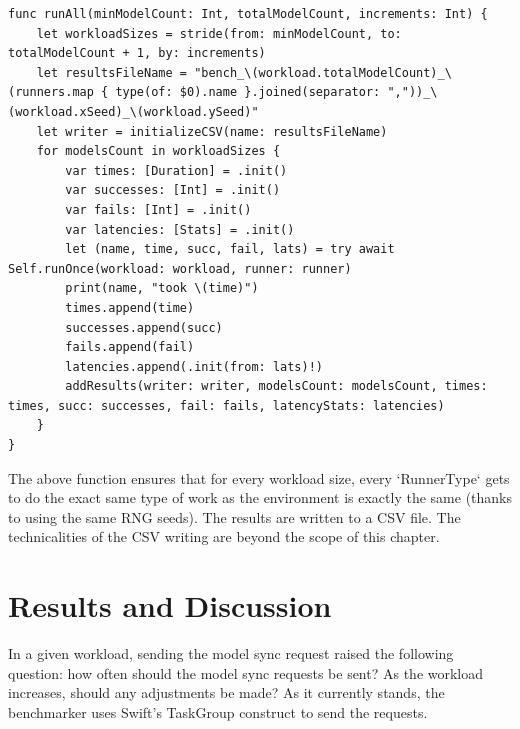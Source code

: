 \begin{verbatim}
func runAll(minModelCount: Int, totalModelCount, increments: Int) {
    let workloadSizes = stride(from: minModelCount, to: totalModelCount + 1, by: increments)
    let resultsFileName = "bench_\(workload.totalModelCount)_\(runners.map { type(of: $0).name }.joined(separator: ","))_\(workload.xSeed)_\(workload.ySeed)"
    let writer = initializeCSV(name: resultsFileName)
    for modelsCount in workloadSizes {
        var times: [Duration] = .init()
        var successes: [Int] = .init()
        var fails: [Int] = .init()
        var latencies: [Stats] = .init()
        let (name, time, succ, fail, lats) = try await Self.runOnce(workload: workload, runner: runner)
        print(name, "took \(time)")
        times.append(time)
        successes.append(succ)
        fails.append(fail)
        latencies.append(.init(from: lats)!)
        addResults(writer: writer, modelsCount: modelsCount, times: times, succ: successes, fail: fails, latencyStats: latencies)
    }
}
\end{verbatim}

The above function ensures that for every workload size, every `RunnerType` gets to do the exact same type of work as the environment is exactly the same (thanks to using the same RNG seeds). The results are written to a CSV file. The technicalities of the CSV writing are beyond the scope of this chapter.


\section{Results and Discussion}
In a given workload, sending the model sync request raised the following question: how often should the model sync requests be sent? As the workload increases, should any adjustments be made? As it currently stands, the benchmarker uses Swift's TaskGroup construct to send the requests.
